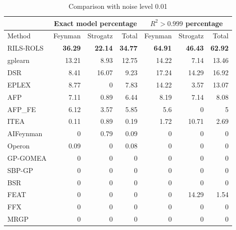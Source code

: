 \documentclass[a4paper,12pt]{elsarticle}
\begin{document}
\begin{table}[!htb]
	\caption{Comparison with noise level 0.01}\label{tab:comp_noise001}
	\centering
	\begin{tabular}{l|rrr|rrr} \hline
		& \multicolumn{3}{c|}{Exact model percentage} & \multicolumn{3}{c}{$R^2 > 0.999$ percentage}\\ \hline
		Method & Feynman & Strogatz & Total & Feynman & Strogatz & Total \\ \hline
		RILS-ROLS&\bf{36.29}&\bf{22.14}&\bf{34.77}&\bf{64.91}&\bf{46.43}&\bf{62.92}\\
		gplearn&13.21&8.93&12.75&14.22&7.14&13.46\\
		DSR&8.41&16.07&9.23&17.24&14.29&16.92\\
		EPLEX&8.77&0&7.83&14.22&3.57&13.07\\
		AFP&7.11&0.89&6.44&8.19&7.14&8.08\\
		AFP\_FE&6.12&3.57&5.85&5.6&0&5\\
		ITEA&0.11&0.89&0.19&1.72&10.71&2.69\\
		AIFeynman&0&0.79&0.09&0&0&0\\
		Operon&0.09&0&0.08&0&0&0\\
		GP-GOMEA&0&0&0&0&0&0\\
		SBP-GP&0&0&0&0&0&0\\
		BSR&0&0&0&0&0&0\\
		FEAT&0&0&0&0&14.29&1.54\\
		FFX&0&0&0&0&0&0\\
		MRGP&0&0&0&0&0&0\\
		\hline
	\end{tabular}
\end{table}

\begin{center}
\label{fig:compExact_noise_size}
\end{center}
\end{document}
